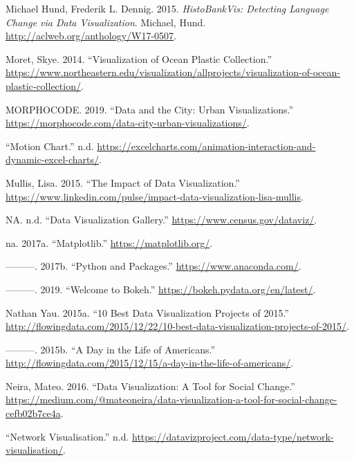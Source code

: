 \documentclass[]{book}
\begin{document}
\leavevmode\hypertarget{ref-lingui_data1}{}%
Michael Hund, Frederik L. Dennig. 2015. \emph{HistoBankVis: Detecting Language Change via Data Visualization}. Michael, Hund. \url{http://aclweb.org/anthology/W17-0507}.

\leavevmode\hypertarget{ref-ocean_plastic_pollution}{}%
Moret, Skye. 2014. ``Visualization of Ocean Plastic Collection.'' \url{https://www.northeastern.edu/visualization/allprojects/visualization-of-ocean-plastic-collection/}.

\leavevmode\hypertarget{ref-MORPHOCODE}{}%
MORPHOCODE. 2019. ``Data and the City: Urban Visualizations.'' \url{https://morphocode.com/data-city-urban-visualizations/}.

\leavevmode\hypertarget{ref-motion_chart}{}%
``Motion Chart.'' n.d. \url{https://excelcharts.com/animation-interaction-and-dynamic-excel-charts/}.

\leavevmode\hypertarget{ref-image_good}{}%
Mullis, Lisa. 2015. ``The Impact of Data Visualization.'' \url{https://www.linkedin.com/pulse/impact-data-visualization-lisa-mullis}.

\leavevmode\hypertarget{ref-data_viz_gallery}{}%
NA. n.d. ``Data Visualization Gallery.'' \url{https://www.census.gov/dataviz/}.

\leavevmode\hypertarget{ref-Matplot}{}%
na. 2017a. ``Matplotlib.'' \url{https://matplotlib.org/}.

\leavevmode\hypertarget{ref-Python2019}{}%
---------. 2017b. ``Python and Packages.'' \url{https://www.anaconda.com/}.

\leavevmode\hypertarget{ref-Bokeh}{}%
---------. 2019. ``Welcome to Bokeh.'' \url{https://bokeh.pydata.org/en/latest/}.

\leavevmode\hypertarget{ref-10_best}{}%
Nathan Yau. 2015a. ``10 Best Data Visualization Projects of 2015.'' \url{http://flowingdata.com/2015/12/22/10-best-data-visualization-projects-of-2015/}.

\leavevmode\hypertarget{ref-American_life}{}%
---------. 2015b. ``A Day in the Life of Americans.'' \url{http://flowingdata.com/2015/12/15/a-day-in-the-life-of-americans/}.

\leavevmode\hypertarget{ref-Socialchange}{}%
Neira, Mateo. 2016. ``Data Visualization: A Tool for Social Change.'' \url{https://medium.com/@mateoneira/data-visualization-a-tool-for-social-change-cefb02b7ce4a}.

\leavevmode\hypertarget{ref-networks}{}%
``Network Visualisation.'' n.d. \url{https://datavizproject.com/data-type/network-visualisation/}.
\end{document}
